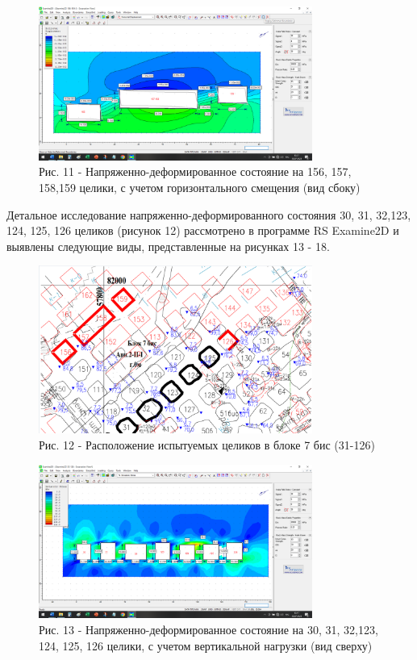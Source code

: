 \begin{figure}[H]
	\centering
	\includegraphics[width=0.8\textwidth]{media/gor/image15}
	\caption*{Рис. 11 - Напряженно-деформированное состояние на 156, 157,
	158,159 целики, с учетом горизонтального смещения (вид сбоку)}
\end{figure}



Детальное исследование напряженно-деформированного состояния 30, 31,
32,123, 124, 125, 126 целиков (рисунок 12) рассмотрено в программе RS
Examine2D и выявлены следующие виды, представленные на рисунках 13 - 18.

\begin{figure}[H]
	\centering
	\includegraphics[width=0.8\textwidth]{media/gor/image9}
	\caption*{Рис. 12 - Расположение испытуемых целиков в блоке 7 бис
	(31-126)}
\end{figure}



\begin{figure}[H]
	\centering
	\includegraphics[width=0.8\textwidth]{media/gor/image16}
	\caption*{Рис. 13 - Напряженно-деформированное состояние на 30, 31,
	32,123, 124, 125, 126 целики, с учетом вертикальной нагрузки (вид сверху)}
\end{figure}



